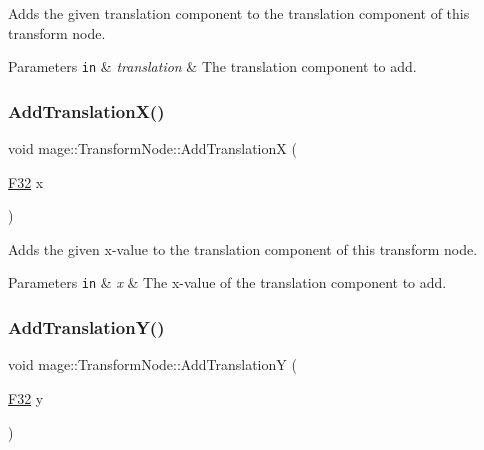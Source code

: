 Adds the given translation component to the translation component of this transform node.


\begin{DoxyParams}[1]{Parameters}
\mbox{\tt in}  & {\em translation} & The translation component to add. \\
\hline
\end{DoxyParams}
\hypertarget{structmage_1_1_transform_node_afa141e560ed1a40080be42bc96cc21cc}{}\label{structmage_1_1_transform_node_afa141e560ed1a40080be42bc96cc21cc} 
\subsubsection{\texorpdfstring{Add\+Translation\+X()}{AddTranslationX()}}
{\footnotesize\ttfamily void mage\+::\+Transform\+Node\+::\+Add\+TranslationX (\begin{DoxyParamCaption}\item[{\hyperlink{namespacemage_aa97e833b45f06d60a0a9c4fc22ae02c0}{F32}}]{x }\end{DoxyParamCaption})\hspace{0.3cm}{\ttfamily [noexcept]}}

Adds the given x-\/value to the translation component of this transform node.


\begin{DoxyParams}[1]{Parameters}
\mbox{\tt in}  & {\em x} & The x-\/value of the translation component to add. \\
\hline
\end{DoxyParams}
\hypertarget{structmage_1_1_transform_node_a0aed339bffcf6bffd1be495617b9f6d9}{}\label{structmage_1_1_transform_node_a0aed339bffcf6bffd1be495617b9f6d9} 
\subsubsection{\texorpdfstring{Add\+Translation\+Y()}{AddTranslationY()}}
{\footnotesize\ttfamily void mage\+::\+Transform\+Node\+::\+Add\+TranslationY (\begin{DoxyParamCaption}\item[{\hyperlink{namespacemage_aa97e833b45f06d60a0a9c4fc22ae02c0}{F32}}]{y }\end{DoxyParamCaption})\hspace{0.3cm}{\ttfamily [noexcept]}}

